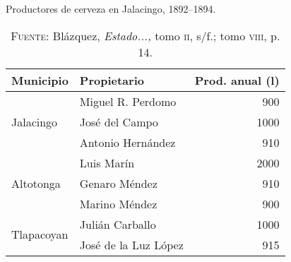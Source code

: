 \documentclass[14pt,twoside,final]{extbook} %
\begin{document}
\begin{table}[h] %
\centering
\caption[Productores de cerveza en Jalacingo, 1892--1894]{Productores de cerveza en Jalacingo, 1892--1894.}
\tlfstyle
\begin{tabular}{@{}llr@{}}
\toprule
Municipio & Propietario & Prod. anual (l) \\
\midrule
{} & Miguel R. Perdomo\index[nombres]{Perdomo, Miguel R.} & 900 \\
Jalacingo\index[lugares]{Jalacingo} & José del Campo\index[nombres]{Campo, Jose del@Campo, José del} & 1000 \\
{} & Antonio Hernández\index[nombres]{Hernandez, Antonio@Hernández, Antonio} & 910 \\
\midrule
{} & Luis Marín\index[nombres]{Marin, Luis@Marín, Luis} & 2000 \\ 
Altotonga\index[lugares]{Altotonga} & Genaro Méndez\index[nombres]{Mendez, Genaro@Méndez, Genaro} & 910 \\
{} & Marino Méndez\index[nombres]{Mendez, Marino@Méndez, Marino} & 900 \\
\midrule
\multirow{2}{*}{Tlapacoyan}\index[lugares]{Tlapacoyan} & Julián Carballo\index[nombres]{Carballo, Julian@Carballo, Julián} & 1000 \\
{} & José de la Luz López\index[nombres]{Lopez, Jose de la Luz@López, José de la Luz} & 915 \\
\bottomrule
\end{tabular}
\caption*{\textsc{Fuente:} Blázquez, \emph{Estado...,} tomo \textsc{ii}, s/f.; tomo \textsc{viii}, p. 14.}
\label{tab:productores-cerveza}
\end{table}
\end{document}
